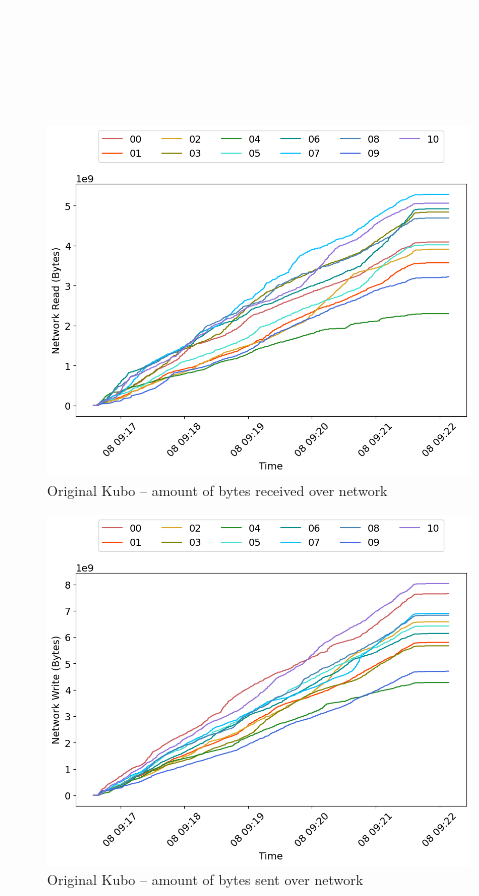 \textcolor{white}{.}\\\\\\\\\\\\

\begin{minipage}{0.5\linewidth}
\begin{figure}[H]
\captionsetup{justification=centering,width=0.8\linewidth}
\includegraphics[width=\linewidth]{figures/original/net_read.png}
\caption{Original Kubo -- amount of bytes received over network}
\label{fig:original-net_read}
\end{figure}
\end{minipage}
\begin{minipage}{0.5\linewidth}
\begin{figure}[H]
\captionsetup{justification=centering,width=0.8\linewidth}
\includegraphics[width=\linewidth]{figures/original/net_write.png}
\caption{Original Kubo -- amount of bytes sent over network}
\label{fig:original-net_write}
\end{figure}
\end{minipage}


